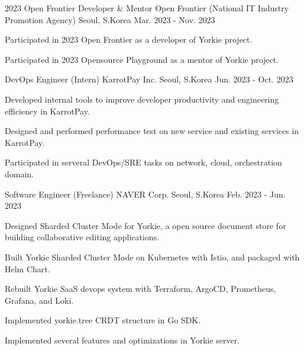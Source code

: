 

\begin{cventries}

\cventry
    {2023 Open Frontier Developer \& Mentor} %
    {Open Frontier (National IT Industry Promotion Agency)} %
    {Seoul, S.Korea} %
    {Mar. 2023 - Nov. 2023} %
    {
      \begin{cvitems} %
        \item {Participated in 2023 Open Frontier as a developer of Yorkie project.}
        \item {Participated in 2023 Opensource Playground as a mentor of Yorkie project.}
      \end{cvitems}
    }

\cventry
    {DevOps Engineer (Intern)} %
    {KarrotPay Inc.} %
    {Seoul, S.Korea} %
    {Jun. 2023 - Oct. 2023} %
    {
      \begin{cvitems} %
        \item {Developed internal tools to improve developer productivity and engineering efficiency in KarrotPay.}
        \item {Designed and performed performance test on new service and existing services in KarrotPay.}
        \item {Participated in serveral DevOps/SRE tasks on network, cloud, orchestration domain.}
      \end{cvitems}
    }

  \cventry
    {Software Engineer (Freelance)} %
    {NAVER Corp.} %
    {Seoul, S.Korea} %
    {Feb. 2023 - Jun. 2023} %
    {
      \begin{cvitems} %
        \item {Designed Sharded Cluster Mode for Yorkie, a open source document store for building collaborative editing applications.}
        \item {Built Yorkie Sharded Cluster Mode on Kubernetes with Istio, and packaged with Helm Chart.}
        \item {Rebuilt Yorkie SaaS devops system with Terraform, ArgoCD, Prometheus, Grafana, and Loki.}
        \item {Implemented yorkie.tree CRDT structure in Go SDK.}
        \item {Implemented several features and optimizations in Yorkie server.}
      \end{cvitems}
    }


\end{cventries}
